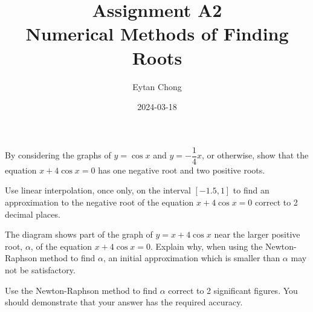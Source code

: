 \documentclass{jhwhw}
\title{Assignment A2\\Numerical Methods of Finding Roots}
\author{Eytan Chong}
\date{2024-03-18}
\begin{document}
    \problem{}
        By considering the graphs of $y = \cos x$ and $y = -\dfrac14 x$, or otherwise, show that the equation $x + 4\cos x = 0$ has one negative root and two positive roots.

        Use linear interpolation, once only, on the interval $[-1.5, 1]$ to find an approximation to the negative root of the equation $x + 4\cos x = 0$ correct to 2 decimal places.

        \begin{center}
        \end{center}

        The diagram shows part of the graph of $y = x + 4\cos x$ near the larger positive root, $\alpha$, of the equation $x + 4\cos x = 0$. Explain why, when using the Newton-Raphson method to find $\alpha$, an initial approximation which is smaller than $\alpha$ may not be satisfactory.

        Use the Newton-Raphson method to find $\alpha$ correct to 2 significant figures. You should demonstrate that your answer has the required accuracy.
\end{document}
